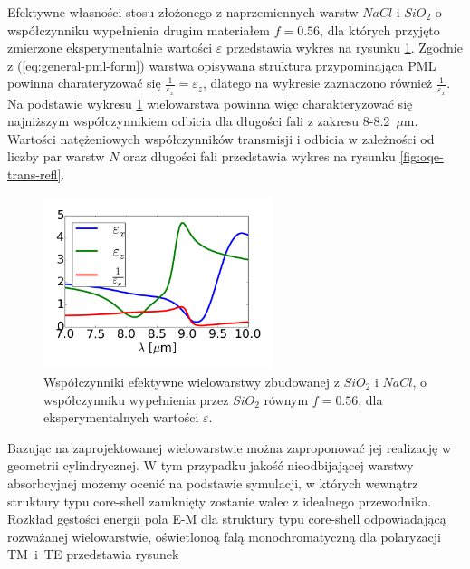 Efektywne własności stosu złożonego z naprzemiennych warstw $NaCl$ i $SiO_2$ o współczynniku wypełnienia drugim materiałem $f=0.56$, dla których przyjęto zmierzone eksperymentalnie wartości $\varepsilon$ przedstawia wykres na rysunku \ref{fig:eff-pml-real}. Zgodnie z (\ref{eq:general-pml-form}) warstwa opisywana struktura przypominająca PML powinna charateryzować się $\frac{1}{\varepsilon_x}=\varepsilon_z$, dlatego na wykresie zaznaczono również $\frac{1}{\varepsilon_x}$. Na podstawie wykresu \ref{fig:eff-pml-real} wielowarstwa powinna więc charakteryzować się najniższym współczynnikiem odbicia dla długości fali z zakresu 8-8.2~$\mu$m. Wartości natężeniowych współczynników transmisji i odbicia w zależności od liczby par warstw $N$ oraz długości fali przedstawia wykres na rysunku \ref{fig:oqe-trans-refl}.

\begin{figure}
	\includegraphics[width=0.6\textwidth]{images/pml/effepsilon-nacl-sio2.png}
	\caption{Współczynniki efektywne wielowarstwy zbudowanej z $SiO_2$ i $NaCl$, o współczynniku wypełnienia przez $SiO_2$ równym $f=0.56$, dla eksperymentalnych wartości $\varepsilon$.}
	\label{fig:eff-pml-real}
\end{figure}

Bazując na zaprojektowanej wielowarstwie można zaproponować jej realizację w geometrii cylindrycznej. W tym przypadku jakość nieodbijającej warstwy absorbcyjnej możemy ocenić na podstawie symulacji, w których wewnątrz struktury typu core-shell zamknięty zostanie walec z idealnego przewodnika. Rozkład gęstości energii pola E-M dla struktury typu core-shell odpowiadającą rozważanej wielowarstwie, oświetlonoą falą monochromatyczną dla polaryzacji TM~i~TE przedstawia rysunek 

